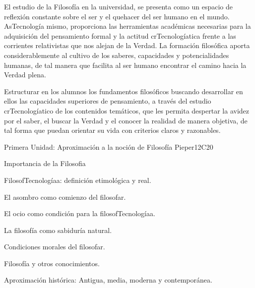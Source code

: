 \begin{syllabus}


\begin{justification}
El estudio de la Filosofía en la universidad, se presenta como un espacio de reflexión constante sobre el ser y el quehacer del ser humano en el mundo. AsTecnología mismo, proporciona las herramientas académicas necesarias para la adquisición del pensamiento formal y la actitud crTecnologíatica frente a las corrientes relativistas que nos alejan de la Verdad.
La formación filosófica aporta considerablemente al cultivo de los saberes, capacidades y potencialidades humanas, de tal manera que facilita al ser humano encontrar el camino hacia la Verdad plena.
\end{justification}

\begin{goals}
\item Estructurar en los alumnos los fundamentos filosóficos buscando desarrollar en ellos las capacidades superiores de pensamiento, a través del estudio crTecnologíatico de los contenidos temáticos, que les permita despertar la avidez por el saber, el buscar la Verdad y el conocer la realidad de manera objetiva, de tal forma que puedan orientar su vida con criterios claros y razonables.
\end{goals}

\begin{outcomes}
    \item {}
    \item {}
    \item {}
\end{outcomes}
\begin{competences}
    \item {}
    \item {}
\end{competences}

\begin{unit}{}{Primera Unidad: Aproximación a la noción de Filosofía }{Pieper}{12}{C20}
\begin{topics}
	\item Importancia de la Filosofia
	\item FilosofTecnologíaa: definición etimológica y real.
	\item El asombro como comienzo del filosofar.
	\item El ocio como condición para la filosofTecnologíaa.
    \item La filosofía como sabiduría natural.
    \item Condiciones morales del filosofar.
    \item Filosofía y otros conocimientos.
    \item Aproximación histórica: Antigua, media, moderna y contemporánea.
\end{topics}


\end{unit}
\end{syllabus}
